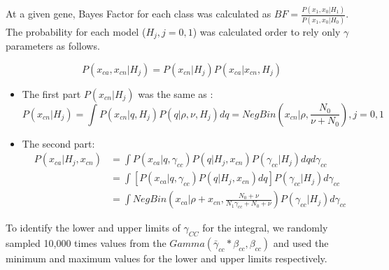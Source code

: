 \documentclass[]{article}
\begin{document}
At a given gene, Bayes Factor for each class was calculated as $BF = \frac{P(x_1, x_0|H_1)}{P(x_1, x_0|H_0)}$. The probability for each model ($H_j, j = 0, 1$) was calculated order to rely only $\gamma$ parameters as follows.

\begin{equation}
P(x_{ca}, x_{cn}|H_j) = P(x_{cn}|H_j) P(x_{ca}|x_{cn}, H_j)
\end{equation}
\begin{itemize}
\item The first part $P(x_{cn}|H_j)$ was the same as \cite{de2014synaptic}:
\begin{equation}
P(x_{cn}|H_j) = \int P(x_{cn}|q, H_j) P(q|\rho, \nu, H_j) dq = NegBin(x_{cn}|\rho, \frac{N_0}{\nu + N_0}), j = 0,1
\end{equation}

\item The second part:
\begin{equation} \label{eq:casecontrolNewIntegral}
\begin{array}{ll}
P(x_{ca}|H_j, x_{cn}) & = \int P(x_{ca}|q, \gamma_{cc}) P(q|H_j, x_{cn}) P(\gamma_{cc} |H_j) dq d\gamma_{cc}  \\
& = \int \left[ P(x_{ca}|q, \gamma_{cc}) P(q|H_j, x_{cn}) dq \right] P(\gamma_{cc} |H_j) d\gamma_{cc} \\
& = \int NegBin(x_{ca}|\rho + x_{cn}, \frac{N_0 + \nu}{N_1 \gamma_{cc} + N_0 + \nu}) P(\gamma_{cc} |H_j) d\gamma_{cc}
\end{array}
\end{equation}
\end{itemize}

To identify the lower and upper limits of $\gamma_{CC}$ for the integral, we randomly sampled 10,000 times values from the $Gamma(\bar{\gamma}_{cc} * \beta_{cc}, \beta_{cc})$ and used the minimum and maximum values for the lower and upper limits respectively.


\end{document}
